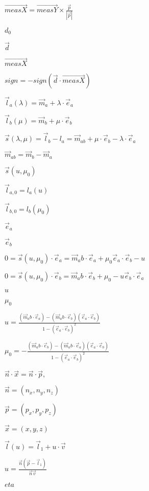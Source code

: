 \documentclass{article}
\begin{document}
$ \vec{measX} = \vec{measY} \times \frac{\vec{p}}{|\vec{p}|} $
\pagebreak

$ d_{0} $
\pagebreak

$ \vec{d} $
\pagebreak

$ \vec{measX} $
\pagebreak

$ sign = -sign(\vec{d} \cdot \vec{measX}) $
\pagebreak

$ \vec l_{a}(\lambda) = \vec m_a + \lambda \cdot \vec e_{a} $
\pagebreak

$ \vec l_{b}(\mu) = \vec m_b + \mu \cdot \vec e_{b} $
\pagebreak

$ \vec s(\lambda, \mu) = \vec l_{b} - l_{a} = \vec m_{ab} + \mu \cdot \vec e_{b} - \lambda \cdot \vec e_{a} $
\pagebreak

$ \vec m_{ab} = \vec m_{b} - \vec m_{a} $
\pagebreak

$ \vec s(u, \mu_0) $
\pagebreak

$ \vec l_{a,0} = l_{a}(u) $
\pagebreak

$ \vec l_{b,0} = l_{b}(\mu_0) $
\pagebreak

$ \vec e_{a} $
\pagebreak

$ \vec e_{b} $
\pagebreak

$ 0 = \vec s(u, \mu_0) \cdot \vec e_a = \vec m_ab \cdot \vec e_a + \mu_0 \vec e_a \cdot \vec e_b - u $
\pagebreak

$ 0 = \vec s(u, \mu_0) \cdot \vec e_b = \vec m_ab \cdot \vec e_b + \mu_0 - u \vec e_b \cdot \vec e_a $
\pagebreak

$ u $
\pagebreak

$ \mu_0 $
\pagebreak

$ u = \frac{(\vec m_ab \cdot \vec e_a)-(\vec m_ab \cdot \vec e_b)(\vec e_a \cdot \vec e_b)}{1-(\vec e_a \cdot \vec e_b)^2} $
\pagebreak

$ \mu_0 = - \frac{(\vec m_ab \cdot \vec e_b)-(\vec m_ab \cdot \vec e_a)(\vec e_a \cdot \vec e_b)}{1-(\vec e_a \cdot \vec e_b)^2} $
\pagebreak

$ \vec n \cdot \vec x = \vec n \cdot \vec p,$
\pagebreak

$ \vec n = (n_{x}, n_{y}, n_{z})$
\pagebreak

$ \vec p = (p_{x}, p_{y}, p_{z})$
\pagebreak

$ \vec x = (x,y,z) $
\pagebreak

$ \vec l(u) = \vec l_{1} + u \cdot \vec v $
\pagebreak

$ u = \frac{\vec n (\vec p - \vec l_{1})}{\vec n \vec v}$
\pagebreak

$ eta $
\pagebreak
\end{document}
